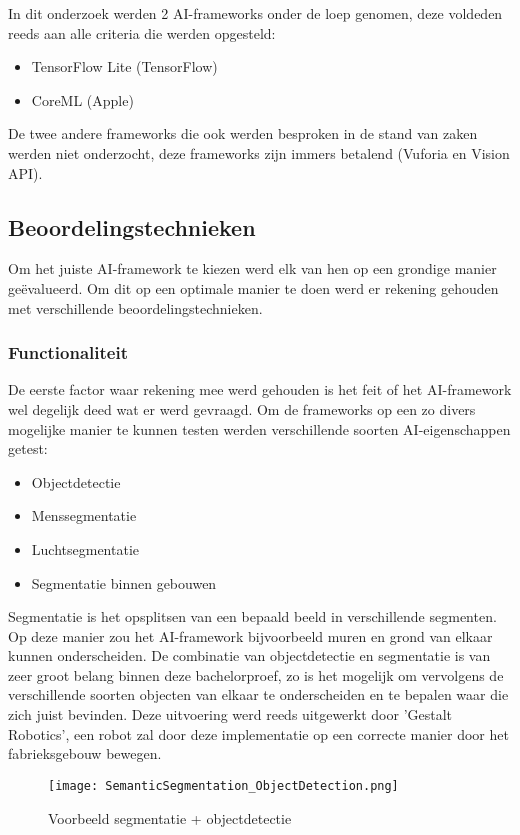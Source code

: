 In dit onderzoek werden 2 AI-frameworks onder de loep genomen, deze voldeden reeds aan alle criteria die werden opgesteld:

\begin{itemize}
	\item TensorFlow Lite (TensorFlow)
	\item CoreML (Apple)
\end{itemize}

De twee andere frameworks die ook werden besproken in de stand van zaken werden niet onderzocht, deze frameworks zijn immers betalend (Vuforia en Vision API). 

\subsection{Beoordelingstechnieken}
Om het juiste AI-framework te kiezen werd elk van hen op een grondige manier geëvalueerd. Om dit op een optimale manier te doen werd er rekening gehouden met verschillende beoordelingstechnieken.

\subsubsection{Functionaliteit}
De eerste factor waar rekening mee werd gehouden is het feit of het AI-framework wel degelijk deed wat er werd gevraagd. Om de frameworks op een zo divers mogelijke manier te kunnen testen werden verschillende soorten AI-eigenschappen getest:
\begin{itemize}
	\item Objectdetectie
	\item Menssegmentatie
	\item Luchtsegmentatie 
	\item Segmentatie binnen gebouwen
\end{itemize}
Segmentatie is het opsplitsen van een bepaald beeld in verschillende segmenten. Op deze manier zou het AI-framework bijvoorbeeld muren en grond van elkaar kunnen onderscheiden. De combinatie van objectdetectie en segmentatie is van zeer groot belang binnen deze bachelorproef, zo is het mogelijk om vervolgens de verschillende soorten objecten van elkaar te onderscheiden en te bepalen waar die zich juist bevinden. Deze uitvoering werd reeds uitgewerkt door 'Gestalt Robotics', een robot zal door deze implementatie op een correcte manier door het fabrieksgebouw bewegen.

\begin{figure}[H]
	\centering
	\texttt{[image: SemanticSegmentation\_ObjectDetection.png]}
	\caption{Voorbeeld segmentatie + objectdetectie \autocite{Gestalt2019}}
\end{figure}

